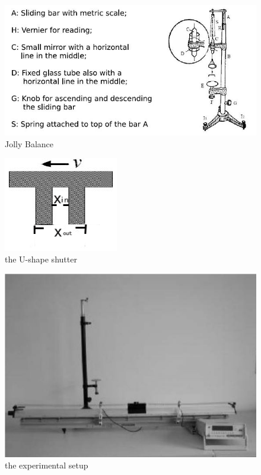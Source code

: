 \documentclass[12pt,a4paper]{article}
\begin{document}
\begin{figure}[H]
    \centering
    \includegraphics[width=12cm]{jollybalance.png}
    \caption{Jolly Balance}
    \label{jolly}
\end{figure}

\begin{figure}[H]
    \centering
    \includegraphics[width=5cm]{ushape.png}
    \caption{the U-shape shutter}
    \label{ushape}
\end{figure}

\begin{figure}[H]
    \centering
    \includegraphics[width=12cm]{setup.png}
    \caption{the experimental setup}
    \label{setup}
\end{figure}
\end{document}
